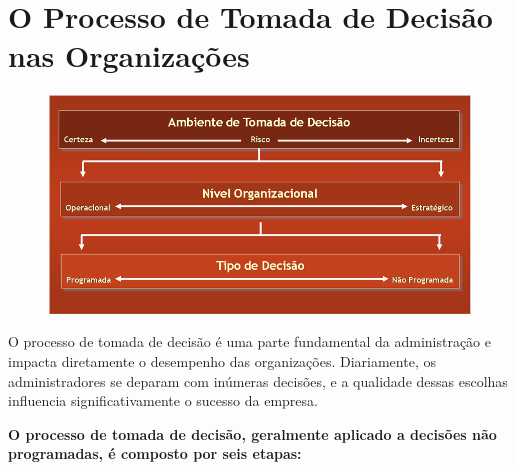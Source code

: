 \section{O Processo de Tomada de Decisão nas Organizações}

\begin{figure}[H]
    \centering
    \begin{minipage}{0.6\textwidth}
        \centering
        \includegraphics[width=\textwidth]{img/imagem5.png}
        \label{fig:exemplo}
    \end{minipage}
\end{figure}

O processo de tomada de decisão é uma parte fundamental da administração e impacta diretamente o desempenho das organizações. Diariamente, os administradores se deparam com inúmeras decisões, e a qualidade dessas escolhas influencia significativamente o sucesso da empresa. 

\textbf{O processo de tomada de decisão, geralmente aplicado a decisões não programadas, é composto por seis etapas:}

